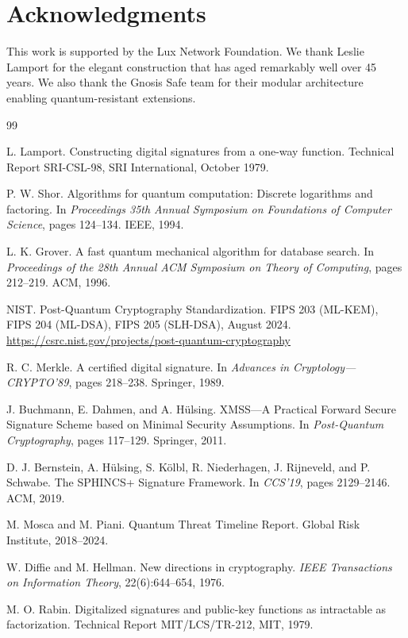 \documentclass[11pt,a4paper]{article}
\begin{document}
\section*{Acknowledgments}

This work is supported by the Lux Network Foundation. We thank Leslie Lamport for the elegant construction that has aged remarkably well over 45 years. We also thank the Gnosis Safe team for their modular architecture enabling quantum-resistant extensions.


\begin{thebibliography}{99}

L. Lamport.
\newblock Constructing digital signatures from a one-way function.
\newblock Technical Report SRI-CSL-98, SRI International, October 1979.

P. W. Shor.
\newblock Algorithms for quantum computation: Discrete logarithms and factoring.
\newblock In \emph{Proceedings 35th Annual Symposium on Foundations of Computer Science}, pages 124--134. IEEE, 1994.

L. K. Grover.
\newblock A fast quantum mechanical algorithm for database search.
\newblock In \emph{Proceedings of the 28th Annual ACM Symposium on Theory of Computing}, pages 212--219. ACM, 1996.

NIST.
\newblock Post-Quantum Cryptography Standardization.
\newblock FIPS 203 (ML-KEM), FIPS 204 (ML-DSA), FIPS 205 (SLH-DSA), August 2024.
\newblock \url{https://csrc.nist.gov/projects/post-quantum-cryptography}

R. C. Merkle.
\newblock A certified digital signature.
\newblock In \emph{Advances in Cryptology---CRYPTO'89}, pages 218--238. Springer, 1989.

J. Buchmann, E. Dahmen, and A. H\"{u}lsing.
\newblock XMSS---A Practical Forward Secure Signature Scheme based on Minimal Security Assumptions.
\newblock In \emph{Post-Quantum Cryptography}, pages 117--129. Springer, 2011.

D. J. Bernstein, A. H\"{u}lsing, S. K\"{o}lbl, R. Niederhagen, J. Rijneveld, and P. Schwabe.
\newblock The SPHINCS+ Signature Framework.
\newblock In \emph{CCS'19}, pages 2129--2146. ACM, 2019.

M. Mosca and M. Piani.
\newblock Quantum Threat Timeline Report.
\newblock Global Risk Institute, 2018--2024.

W. Diffie and M. Hellman.
\newblock New directions in cryptography.
\newblock \emph{IEEE Transactions on Information Theory}, 22(6):644--654, 1976.

M. O. Rabin.
\newblock Digitalized signatures and public-key functions as intractable as factorization.
\newblock Technical Report MIT/LCS/TR-212, MIT, 1979.

\end{thebibliography}
\end{document}
